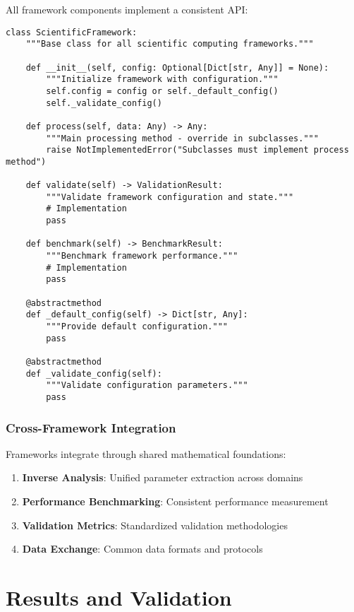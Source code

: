 \documentclass[11pt,a4paper]{article}
\begin{document}
All framework components implement a consistent API:

\begin{lstlisting}[caption=Unified Framework API]
class ScientificFramework:
    """Base class for all scientific computing frameworks."""

    def __init__(self, config: Optional[Dict[str, Any]] = None):
        """Initialize framework with configuration."""
        self.config = config or self._default_config()
        self._validate_config()

    def process(self, data: Any) -> Any:
        """Main processing method - override in subclasses."""
        raise NotImplementedError("Subclasses must implement process method")

    def validate(self) -> ValidationResult:
        """Validate framework configuration and state."""
        # Implementation
        pass

    def benchmark(self) -> BenchmarkResult:
        """Benchmark framework performance."""
        # Implementation
        pass

    @abstractmethod
    def _default_config(self) -> Dict[str, Any]:
        """Provide default configuration."""
        pass

    @abstractmethod
    def _validate_config(self):
        """Validate configuration parameters."""
        pass
\end{lstlisting}

\subsubsection{Cross-Framework Integration}
\label{subsubsec:cross_framework}

Frameworks integrate through shared mathematical foundations:

\begin{enumerate}
    \item \textbf{Inverse Analysis}: Unified parameter extraction across domains
    \item \textbf{Performance Benchmarking}: Consistent performance measurement
    \item \textbf{Validation Metrics}: Standardized validation methodologies
    \item \textbf{Data Exchange}: Common data formats and protocols
\end{enumerate}

\section{Results and Validation}
\label{sec:results}
\end{document}
